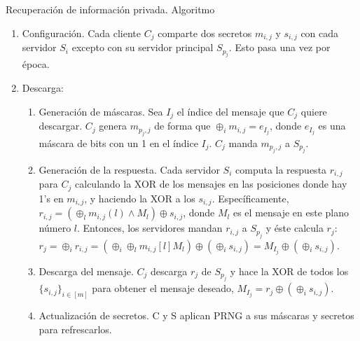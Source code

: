 \documentclass[10pt]{beamer}
\begin{document}
\begin{frame}{Recuperación de información privada. Algoritmo}
	\pause
\begin{enumerate}
	\item Configuración. Cada cliente $C_j$ comparte dos secretos $m_{i,j}$ y $s_{i,j}$  con cada servidor $S_i$ excepto con su servidor principal $S_{p_j}$. Esto pasa una vez por época.
	\item Descarga:
	\begin{enumerate}
		\item Generación de máscaras. Sea $I_j$ el índice del mensaje que $C_j$ quiere descargar. $C_j$ genera $m_{p_j,j}$ de forma que $\oplus _i m_{i,j} = e_{I_j}$, donde $e_{I_j}$ es una máscara de bits con un 1 en el índice $I_j$. $C_j$ manda $m_{p_j,j}$ a $S_{p_j}$.
		\item Generación de la respuesta. Cada servidor $S_i$ computa la respuesta $r_{i,j}$ para $C_j$ calculando la XOR de los mensajes en las posiciones donde hay 1's en $m_{i,j}$, y haciendo la XOR a los $s_{i,j}$. Específicamente, $r_{i,j} = (\oplus _l m_{i,j}(l) \land M_l) \oplus s_{i,j}$, donde $M_l$ es el mensaje en este plano número $l$. Entonces, los servidores mandan $r_{i,j}$ a $S_{p_j}$ y éste calcula $r_j$:
		$r_j=\oplus _i r_{i,j} = (\oplus _i \oplus _l m_{i,j}[l] M_l) \oplus (\oplus _i s_{i,j}) = M_{I_j} \oplus (\oplus _i s_{i,j})$.
		\item Descarga del mensaje. $C_j$ descarga $r_j$ de $S_{p_j}$ y hace la XOR de todos los $\{s_{i,j}\}_{i \in [m]}$ para obtener el mensaje deseado, $M_{I_j}= r_j \oplus (\oplus _i s_{i,j})$.
		\item Actualización de secretos. C y S aplican PRNG a sus máscaras y secretos para refrescarlos. 
	\end{enumerate}
\end{enumerate}
\end{frame}		
\end{document}
